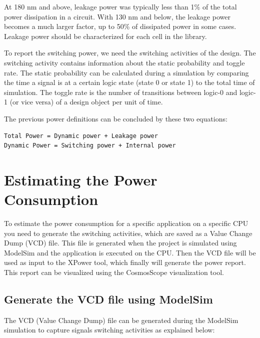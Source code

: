At 180 nm and above, leakage power was typically less than 1\% of the
total power dissipation in a circuit. With 130 nm and below, the leakage
power becomes a much larger factor, up to 50\% of dissipated power in
some cases. Leakage power should be characterized for each cell in the
library.

To report the switching power, we need the switching activities of the
design. The switching activity contains information about the static
probability and toggle rate. The static probability can be calculated
during a simulation by comparing the time a signal is at a certain logic
state (state 0 or state 1) to the total time of simulation. The toggle
rate is the number of transitions between logic-0 and logic-1 (or vice
versa) of a design object per unit of time.

The previous power definitions can be concluded by these two equations:
\begin{lstlisting}
Total Power = Dynamic power + Leakage power
Dynamic Power = Switching power + Internal power	
\end{lstlisting}
\hypertarget{estimating-the-power-consumption}{%
\section{Estimating the Power
Consumption}\label{estimating-the-power-consumption}}

To estimate the power consumption for a specific application on a
specific CPU you need to generate the switching activities, which are
saved as a Value Change Dump (VCD) file. This file is generated when the
project is simulated using ModelSim and the application is executed on
the CPU. Then the VCD file will be used as input to the XPower tool,
which finally will generate the power report. This report can be
visualized using the CosmosScope visualization tool.

\hypertarget{generate-the-vcd-file-using-modelsim}{%
\subsection{Generate the VCD file using
ModelSim}\label{generate-the-vcd-file-using-modelsim}}

The VCD (Value Change Dump) file can be generated during the ModelSim
simulation to capture signals switching activities as explained below:

